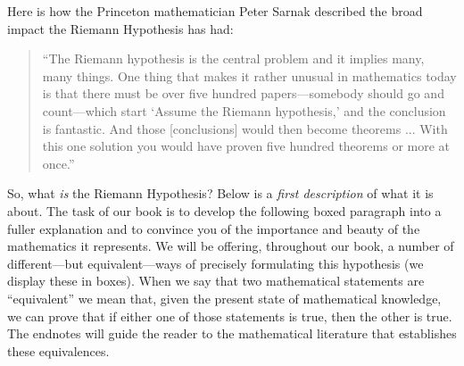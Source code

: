\documentclass[openany]{book}
\theoremstyle{plain}
\theoremstyle{definition}
\begin{document}
Here is how the
Princeton mathematician Peter Sarnak described the broad impact the
Riemann Hypothesis has had:
\begin{quote}
``The Riemann hypothesis is the central problem and it implies many,
many things. One thing that makes it rather unusual in mathematics
today is that there must be over five hundred papers---somebody should
go and count---which start `Assume the Riemann hypothesis,' and
the conclusion is fantastic. And those [conclusions] would then become
theorems ... With this one solution you would have proven five hundred
theorems or more at once.'' 
\end{quote}



So, what {\it is} the Riemann Hypothesis?  Below is a {\it first
  description} of what it is about. The task of our book is to develop
the following boxed paragraph into a fuller explanation and to
convince you of the importance and beauty of the mathematics it
represents.  We will be offering, throughout our book, a number of
different---but equivalent---ways of precisely formulating this
hypothesis (we display these in boxes).  When we say that two
mathematical statements are ``equivalent'' we mean that, given the
present state of mathematical knowledge, we can prove that if either
one of those statements is true, then the other is true. The endnotes
will guide the reader to the mathematical literature that establishes
these equivalences.
\end{document}

